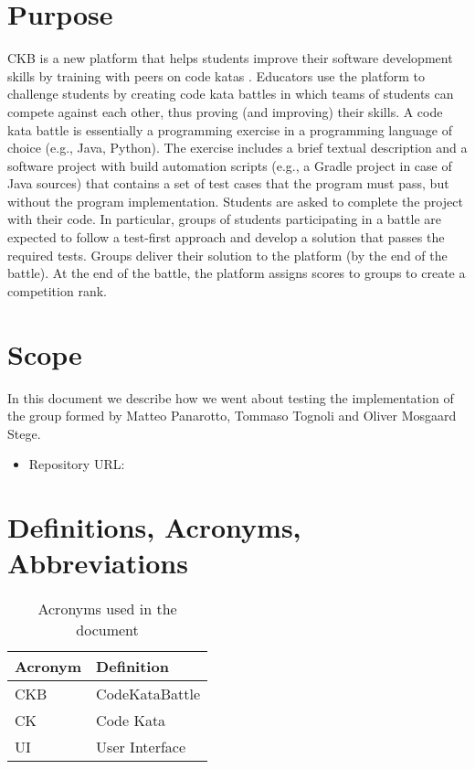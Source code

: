 \section{Purpose}
\ac{CKB} is a new platform that helps students improve their software development skills by training with peers on code katas . Educators use the platform to challenge students by creating code kata battles in which teams of students can compete against each other, thus proving (and improving) their skills.\newline
A code kata battle is essentially a programming exercise in a programming language of choice (e.g., Java, Python). The exercise includes a brief textual description and a software project with build automation scripts (e.g., a Gradle project in case of Java sources) that contains a set of test cases that the program must pass, but without the program implementation. Students are asked to complete the project with their code. In particular, groups of students participating in a battle are expected to follow a test-first approach and develop a solution that passes the required tests. Groups deliver their solution to the platform (by the end of the battle). At the end of the battle, the platform assigns scores to groups to create a competition rank.

\section{Scope}
In this document we describe how we went about testing the implementation of the group formed by Matteo Panarotto, Tommaso Tognoli and Oliver Mosgaard Stege. 
\begin{itemize}
    \item Repository URL:
        \href{https://github.com/Smrevilo/StegeTognoliPanarotto}{}
\end{itemize}


\section{Definitions, Acronyms, Abbreviations}

\begin{table}[H]
    \begin{center}
        \begin{tabular}{|l|l|}
            \hline
            \textbf{Acronym} & \textbf{Definition}\\
            \hline
            CKB & CodeKataBattle\\
            \hline
            CK & Code Kata\\
            \hline
            UI & User Interface\\
            \hline
        \end{tabular}
        \caption{Acronyms used in the document}
    \end{center}
\end{table}

